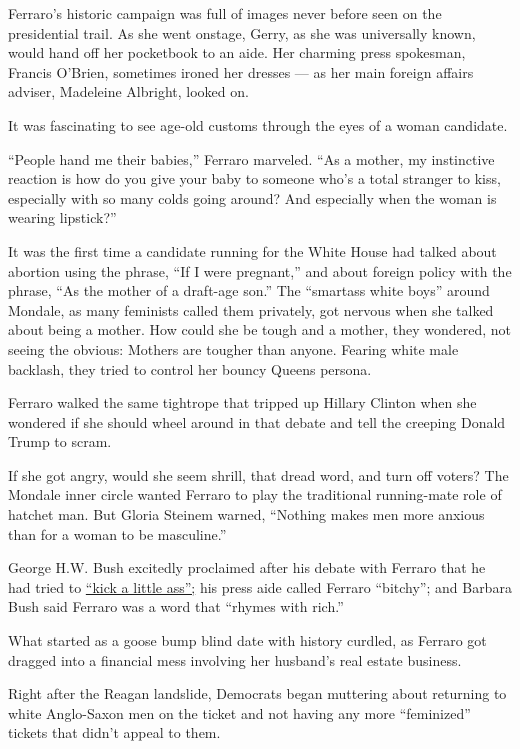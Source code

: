 Ferraro's historic campaign was full of images never before seen on the
presidential trail. As she went onstage, Gerry, as she was universally
known, would hand off her pocketbook to an aide. Her charming press
spokesman, Francis O'Brien, sometimes ironed her dresses --- as her main
foreign affairs adviser, Madeleine Albright, looked on.

It was fascinating to see age-old customs through the eyes of a woman
candidate.

``People hand me their babies,'' Ferraro marveled. ``As a mother, my
instinctive reaction is how do you give your baby to someone who's a
total stranger to kiss, especially with so many colds going around? And
especially when the woman is wearing lipstick?''

It was the first time a candidate running for the White House had talked
about abortion using the phrase, ``If I were pregnant,'' and about
foreign policy with the phrase, ``As the mother of a draft-age son.''
The ``smartass white boys'' around Mondale, as many feminists called
them privately, got nervous when she talked about being a mother. How
could she be tough and a mother, they wondered, not seeing the obvious:
Mothers are tougher than anyone. Fearing white male backlash, they tried
to control her bouncy Queens persona.

Ferraro walked the same tightrope that tripped up Hillary Clinton when
she wondered if she should wheel around in that debate and tell the
creeping Donald Trump to scram.

If she got angry, would she seem shrill, that dread word, and turn off
voters? The Mondale inner circle wanted Ferraro to play the traditional
running-mate role of hatchet man. But Gloria Steinem warned, ``Nothing
makes men more anxious than for a woman to be masculine.''

George H.W. Bush excitedly proclaimed after his debate with Ferraro that
he had tried to
\href{https://www.nytimes.com/1984/10/14/us/aide-to-ferraro-demands-bush-make-apology.html}{``kick
a little ass'';} his press aide called Ferraro ``bitchy''; and Barbara
Bush said Ferraro was a word that ``rhymes with rich.''

What started as a goose bump blind date with history curdled, as Ferraro
got dragged into a financial mess involving her husband's real estate
business.

Right after the Reagan landslide, Democrats began muttering about
returning to white Anglo-Saxon men on the ticket and not having any more
``feminized'' tickets that didn't appeal to them.

